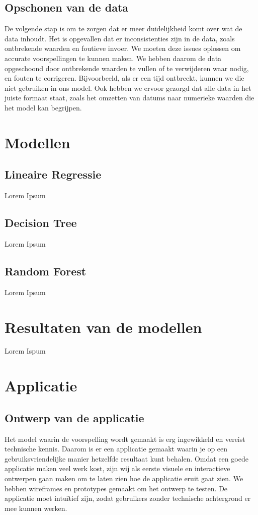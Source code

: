 \documentclass{article}
\begin{document}
\subsection{Opschonen van de data}
De volgende stap is om te zorgen dat er meer duidelijkheid komt over wat de data inhoudt. Het is opgevallen dat er inconsistenties zijn in de data, zoals ontbrekende waarden en foutieve invoer. We moeten deze issues oplossen om accurate voorspellingen te kunnen maken. We hebben daarom de data opgeschoond door ontbrekende waarden te vullen of te verwijderen waar nodig, en fouten te corrigeren. Bijvoorbeeld, als er een tijd ontbreekt, kunnen we die niet gebruiken in ons model. Ook hebben we ervoor gezorgd dat alle data in het juiste formaat staat, zoals het omzetten van datums naar numerieke waarden die het model kan begrijpen.

\newpage
\section{Modellen}

\subsection{Lineaire Regressie}
Lorem Ipsum

\subsection{Decision Tree}
Lorem Ipsum

\subsection{Random Forest}
Lorem Ipsum

\section{Resultaten van de modellen}
Lorem Ispum

\newpage
\section{Applicatie}

\subsection{Ontwerp van de applicatie}
Het model waarin de voorspelling wordt gemaakt is erg ingewikkeld en vereist technische kennis. Daarom is er een applicatie gemaakt waarin je op een gebruiksvriendelijke manier hetzelfde resultaat kunt behalen. Omdat een goede applicatie maken veel werk kost, zijn wij als eerste visuele en interactieve ontwerpen gaan maken om te laten zien hoe de applicatie eruit gaat zien. We hebben wireframes en prototypes gemaakt om het ontwerp te testen. De applicatie moet intuïtief zijn, zodat gebruikers zonder technische achtergrond er mee kunnen werken.
\end{document}
